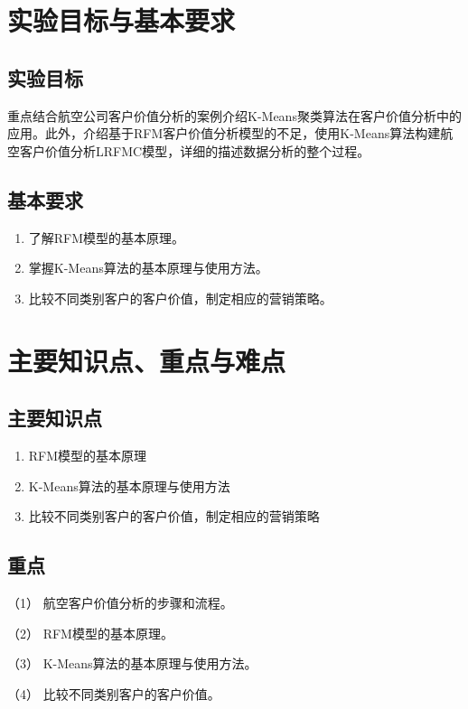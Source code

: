 \documentclass[UTF8,12pt]{article}
\begin{document}
\begin{center}
    \tableofcontents
\end{center}
\newpage

\section{实验目标与基本要求}
\subsection{实验目标}
重点结合航空公司客户价值分析的案例介绍K-Means聚类算法在客户价值分析中的应用。此外，介绍基于RFM客户价值分析模型的不足，使用K-Means算法构建航空客户价值分析LRFMC模型，详细的描述数据分析的整个过程。

\subsection{基本要求}
\begin{enumerate}
    \item 了解RFM模型的基本原理。
    \item 掌握K-Means算法的基本原理与使用方法。
    \item 比较不同类别客户的客户价值，制定相应的营销策略。
\end{enumerate}

\section{主要知识点、重点与难点}
\subsection{主要知识点}
\begin{enumerate}
    \item RFM模型的基本原理
    \item K-Means算法的基本原理与使用方法
    \item 比较不同类别客户的客户价值，制定相应的营销策略
\end{enumerate}
    
\subsection{重点}
（1） 航空客户价值分析的步骤和流程。

（2） RFM模型的基本原理。

（3） K-Means算法的基本原理与使用方法。

（4） 比较不同类别客户的客户价值。
\end{document}
